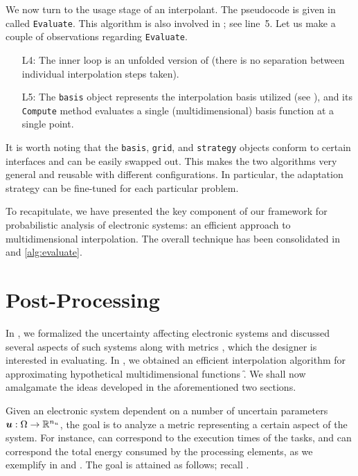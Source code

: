We now turn to the usage stage of an interpolant. The pseudocode is given in
 called \texttt{Evaluate}. This algorithm is also involved in
; see line~5. Let us make a couple of observations regarding
\texttt{Evaluate}.

\begin{itemize}

\item[L4:] The inner loop is an unfolded version of  (there
is no separation between individual interpolation steps taken).

\item[L5:] The \texttt{basis} object represents the interpolation basis utilized
(see ), and its \texttt{Compute} method evaluates a single
(multidimensional) basis function at a single point.

\end{itemize}

It is worth noting that the \texttt{basis}, \texttt{grid}, and \texttt{strategy}
objects conform to certain interfaces and can be easily swapped out. This makes
the two algorithms very general and reusable with different configurations. In
particular, the adaptation strategy can be fine-tuned for each particular
problem.

To recapitulate, we have presented the key component of our framework for
probabilistic analysis of electronic systems: an efficient approach to
multidimensional interpolation. The overall technique has been consolidated in
 and \ref{alg:evaluate}.

\section{Post-Processing}

In , we formalized the uncertainty affecting electronic systems
and discussed several aspects of such systems along with metrics \g, which the
designer is interested in evaluating. In , we obtained an
efficient interpolation algorithm for approximating hypothetical
multidimensional functions \f. We shall now amalgamate the ideas developed in
the aforementioned two sections.

Given an electronic system dependent on a number of uncertain parameters $\boldsymbol{u}:
\Omega \to \mathbb{R}^{n_{u}}$, the goal is to analyze a metric \g representing a certain
aspect of the system. For instance, \vu can correspond to the execution times of
the tasks, and \g can correspond the total energy consumed by the processing
elements, as we exemplify in  and . The goal is attained
as follows; recall .

